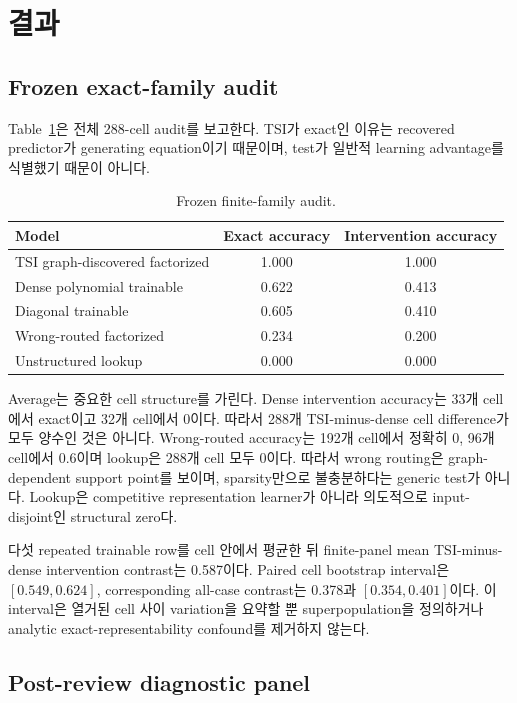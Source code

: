 \section{결과}

\subsection{Frozen exact-family audit}

Table~\ref{tab:main}은 전체 288-cell audit를 보고한다. TSI가 exact인 이유는
recovered predictor가 generating equation이기 때문이며, test가 일반적 learning
advantage를 식별했기 때문이 아니다.

\begin{table}[ht]
\centering
\caption{Frozen finite-family audit.}
\label{tab:main}
\begin{tabular}{lcc}
\toprule
Model & Exact accuracy & Intervention accuracy\\
\midrule
TSI graph-discovered factorized & 1.000 & 1.000\\
Dense polynomial trainable & 0.622 & 0.413\\
Diagonal trainable & 0.605 & 0.410\\
Wrong-routed factorized & 0.234 & 0.200\\
Unstructured lookup & 0.000 & 0.000\\
\bottomrule
\end{tabular}
\end{table}

Average는 중요한 cell structure를 가린다. Dense intervention accuracy는 33개
cell에서 exact이고 32개 cell에서 0이다. 따라서 288개 TSI-minus-dense cell
difference가 모두 양수인 것은 아니다. Wrong-routed accuracy는 192개 cell에서
정확히 0, 96개 cell에서 0.6이며 lookup은 288개 cell 모두 0이다. 따라서 wrong
routing은 graph-dependent support point를 보이며, sparsity만으로 불충분하다는
generic test가 아니다. Lookup은 competitive representation learner가 아니라
의도적으로 input-disjoint인 structural zero다.

다섯 repeated trainable row를 cell 안에서 평균한 뒤 finite-panel mean
TSI-minus-dense intervention contrast는 0.587이다. Paired cell bootstrap interval은
\([0.549,0.624]\), corresponding all-case contrast는 0.378과
\([0.354,0.401]\)이다. 이 interval은 열거된 cell 사이 variation을 요약할 뿐
superpopulation을 정의하거나 analytic exact-representability confound를 제거하지
않는다.

\subsection{Post-review diagnostic panel}

